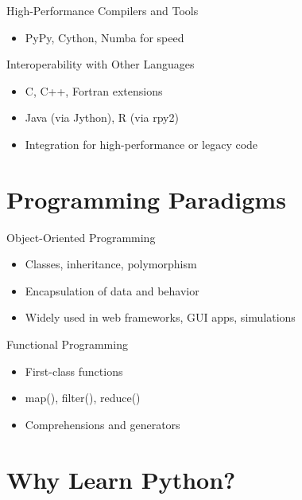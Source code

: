 \documentclass[12pt, aspectratio=169]{beamer}
\begin{document}
    \begin{frame}{High-Performance Compilers and Tools}
        \begin{itemize}
            \item PyPy, Cython, Numba for speed
        \end{itemize}
    \end{frame}


    \begin{frame}{Interoperability with Other Languages}
        \begin{itemize}
            \item C, C++, Fortran extensions
            \item Java (via Jython), R (via rpy2)
            \item Integration for high-performance or legacy code
        \end{itemize}
    \end{frame}


    \section{Programming Paradigms}

    \begin{frame}{Object-Oriented Programming}
        \begin{itemize}
            \item Classes, inheritance, polymorphism
            \item Encapsulation of data and behavior
            \item Widely used in web frameworks, GUI apps, simulations
        \end{itemize}
    \end{frame}


    \begin{frame}{Functional Programming}
        \begin{itemize}
            \item First-class functions
            \item map(), filter(), reduce()
            \item Comprehensions and generators
        \end{itemize}
    \end{frame}


    \section{Why Learn Python?}
\end{document}
